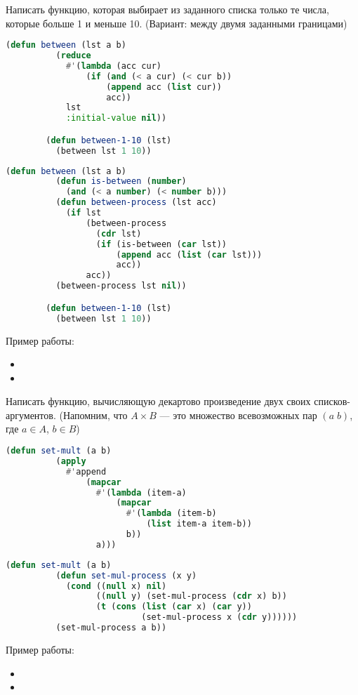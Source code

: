 \documentclass[a4paper,oneside,12pt]{extreport}
\begin{document}
\begin{task}
	Написать функцию, которая выбирает из заданного списка только те числа, которые больше 1 и меньше 10.
	(Вариант: между двумя заданными границами)

	\begin{lstlisting}[language=Lisp, gobble=16]
		(defun between (lst a b)
		  (reduce
		    #'(lambda (acc cur)
		        (if (and (< a cur) (< cur b))
		            (append acc (list cur))
		            acc))
		    lst
		    :initial-value nil))

		(defun between-1-10 (lst)
		  (between lst 1 10))
	\end{lstlisting}

	\begin{lstlisting}[language=Lisp, gobble=16]
		(defun between (lst a b)
		  (defun is-between (number)
		    (and (< a number) (< number b)))
		  (defun between-process (lst acc)
		    (if lst
		        (between-process
		          (cdr lst)
		          (if (is-between (car lst))
		              (append acc (list (car lst)))
		              acc))
		        acc))
		  (between-process lst nil))

		(defun between-1-10 (lst)
		  (between lst 1 10))
	\end{lstlisting}

	Пример работы:
	\begin{itemize}
		\item {}
		\item {}
	\end{itemize}
\end{task}

\begin{task}
	Написать функцию, вычисляющую декартово произведение двух своих списков-аргументов.
	(Напомним, что $A\times B$ — это множество всевозможных пар $(a\;b)$, где $a\in A$, $b\in B$)

	\begin{lstlisting}[language=Lisp, gobble=16]
		(defun set-mult (a b)
		  (apply
		    #'append
		        (mapcar
		          #'(lambda (item-a)
		              (mapcar
		                #'(lambda (item-b)
		                    (list item-a item-b))
		                b))
		          a)))
	\end{lstlisting}

	\begin{lstlisting}[language=Lisp, gobble=16]
		(defun set-mult (a b)
		  (defun set-mul-process (x y)
		    (cond ((null x) nil)
		          ((null y) (set-mul-process (cdr x) b))
		          (t (cons (list (car x) (car y))
		                   (set-mul-process x (cdr y))))))
		  (set-mul-process a b))
	\end{lstlisting}

	Пример работы:
	\begin{itemize}
		\item {}
		\item {}
	\end{itemize}
\end{task}
\end{document}
